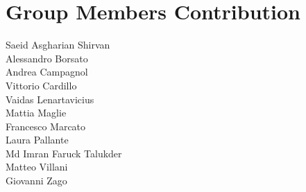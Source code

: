 \section{Group Members Contribution}


\begin{description}
	\item[Saeid Asgharian Shirvan] 
	\item[Alessandro Borsato] 
	\item[Andrea Campagnol]
	\item[Vittorio Cardillo] 
	\item[Vaidas Lenartavicius] 
	\item[Mattia Maglie] 
	\item[Francesco Marcato] 
	\item[Laura Pallante] 
	\item[Md Imran Faruck Talukder] 
	\item[Matteo Villani] 
	\item[Giovanni Zago]
\end{description}